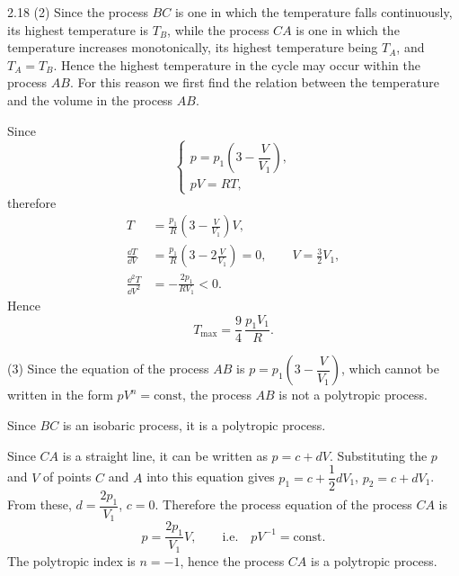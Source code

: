 \begin{solution}{2.18}
(2) Since the process $BC$ is one in which the temperature falls continuously, its highest
temperature is $T_B$, while the process $CA$ is one in which the temperature increases
monotonically, its highest temperature being $T_A$, and $T_A=T_B$. Hence the highest temperature
in the cycle may occur within the process $AB$. For this reason we first find the relation
between the temperature and the volume in the process $AB$.

Since
\begin{equation*}
\begin{cases}
p = p_1\left(3-\dfrac{V}{V_1}\right),\\[4pt]
pV = RT,
\end{cases}
\end{equation*}
therefore
\begin{align*}
T &= \frac{p_1}{R}\left(3-\frac{V}{V_1}\right)V,\\
\frac{\dd T}{\dd V} &= \frac{p_1}{R}\left(3-2\frac{V}{V_1}\right)=0,
\qquad V=\frac{3}{2}V_1,\\
\frac{\dd^2T}{\dd V^2} &= -\frac{2p_1}{RV_1}<0 .
\end{align*}
Hence
\begin{equation*}
T_{\max} = \frac{9}{4}\,\frac{p_1V_1}{R}.
\end{equation*}

(3) Since the equation of the process $AB$ is $p=p_1\left(3-\dfrac{V}{V_1}\right)$, which cannot
be written in the form $pV^n=\text{const}$, the process $AB$ is not a polytropic process.

Since $BC$ is an isobaric process, it is a polytropic process.

Since $CA$ is a straight line, it can be written as $p=c+dV$. Substituting the $p$ and $V$ of
points $C$ and $A$ into this equation gives $p_1=c+\dfrac{1}{2}dV_1$, $p_2=c+dV_1$. From these,
$d=\dfrac{2p_1}{V_1}$, $c=0$. Therefore the process equation of the process $CA$ is
\begin{equation*}
p = \frac{2p_1}{V_1}V,\qquad\text{i.e.}\quad pV^{-1}=\text{const}.
\end{equation*}
The polytropic index is $n=-1$, hence the process $CA$ is a polytropic process.
\end{solution}

